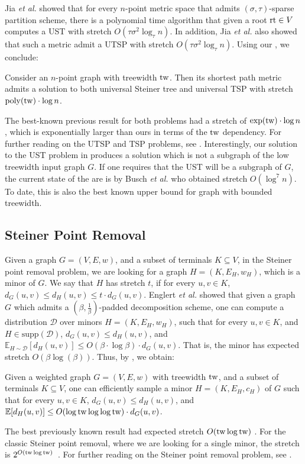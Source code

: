 \documentclass{article}
\newcommand{\tw}{{\rm tw}}
\newcommand{\poly}{\mathrm{poly}}
\newcommand{\supp}{\mathrm{supp}}
\newcommand{\etal}{{\em et al. \xspace}}
\newcommand{\UST}{\textsf{UST}\xspace}
\newcommand{\UTSP}{\textsf{UTSP}\xspace}
\newcommand{\TSP}{\textsf{TSP}\xspace}
\newcommand{\rt}{\mbox{\rm rt}}
\newcommand{\calD}{\mathcal{D}}
\newcommand{\E}{{\mathbb{E}}}
\begin{document}
Jia \etal \cite{JLNRS05} showed that for every $n$-point metric space that admits $(\sigma,\tau)$-sparse partition scheme, there is a polynomial time algorithm that given a root $\rt\in V$ computes a  \UST with stretch $O(\tau\sigma^2\log_\tau n)$.
In addition, Jia \etal \cite{JLNRS05} also showed that such a metric admit a \UTSP with stretch  $O(\tau\sigma^2\log_\tau n)$.
Using our , we conclude:
\begin{corollary}\label{cor:UST}
	Consider an $n$-point graph with treewidth $\tw$. Then its shortest path metric admits a solution to both universal Steiner tree and universal TSP with stretch $\poly(\tw)\cdot\log n$. 
\end{corollary}
The best-known previous result for both problems had a stretch of $\exp(\tw)\cdot\log n$ \cite{Fil20}, which is exponentially larger than ours in terms of the $\tw$ dependency. For further reading on the \UTSP and \TSP problems, see \cite{platzman1989spacefilling,bertsimas1989worst,JLNRS05,GHR06,HKL06,schalekamp2008algorithms,gorodezky2010improved,bhalgat2011optimal,BDRRS12,BLT14,Fil20, Filtser24}. Interestingly, our solution to the \UST problem in  produces a solution which is not a subgraph of the low treewidth input graph $G$. If one requires that the \UST will be a subgraph of $G$, the current state of the are is by Busch \etal \cite{BCFHHR23} who obtained stretch $O(\log^7 n)$. To date, this is also the best known upper bound for graph with bounded treewidth.



\subsection{Steiner Point Removal}
Given a graph $G=(V,E,w)$, and a subset of terminals $K\subseteq V$, in the Steiner point removal problem, we are looking for a graph $H=(K,E_H,w_H)$, which is a minor of $G$. We say that $H$ has stretch $t$, if for every $u,v\in K$, $d_G(u,v)\le d_H(u,v)\le t\cdot d_G(u,v)$. 
Englert \etal \cite{EGKRTT14} showed that given a graph $G$ which admits a $(\beta,\frac1\beta)$-padded decomposition scheme, one can compute a distribution $\calD$ over minors $H=(K,E_H,w_H)$, such that for every $u,v\in K$, and $H\in\supp(\calD)$, $d_G(u,v)\le d_H(u,v)$, and $\E_{H\sim\calD}[d_H(u,v)]\le O(\beta\cdot\log\beta)\cdot d_G(u,v)$. That is, the minor has expected stretch $O(\beta \log(\beta))$. Thus, by , we obtain:

\begin{corollary}\label{cor:SPR}
	Given a weighted graph $G=(V,E,w)$ with treewidth $\tw$, and a subset of terminals $K\subseteq V$, one can efficiently sample a minor $H=(K,E_H,c_H)$ of $G$ such that for every $u,v\in K$, $d_G(u,v)\le d_H(u,v)$, and $\E[d_H(u,v)]\le O(\log\tw\log\log\tw)\cdot d_G(u,v)$.
\end{corollary}
The best previously known result had expected stretch $O(\tw\log\tw)$ \cite{EGKRTT14,AGGNT19}. 
For the classic Steiner point removal, where we are looking for a single minor, the stretch is $2^{O(\tw\log\tw)}$~\cite{CCLMST23}. For further reading on the Steiner point removal problem, see \cite{G01,CXKR06,KKN15,Che18,Fil19,FKT19,Fil20,HL22,CCLMST23}.
\end{document}
